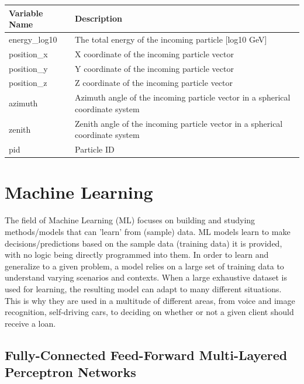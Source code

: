 \documentclass[a4paper,10pt]{scrartcl}
\begin{document}
\begin{center}
    \begin{tabular}{ |l|l| }
        \hline
        Variable Name & Description                                                                    \\
        \hline
        energy\_log10 & The total energy of the incoming particle [log10 GeV]                          \\
        position\_x   & X coordinate of the incoming particle vector                                   \\
        position\_y   & Y coordinate of the incoming particle vector                                   \\
        position\_z   & Z coordinate of the incoming particle vector                                   \\
        azimuth       & Azimuth angle of the incoming particle vector in a spherical coordinate system \\
        zenith        & Zenith angle of the incoming particle vector in a spherical coordinate system  \\
        pid           & Particle ID                                                                    \\
        \hline
    \end{tabular}
\end{center}

\section{Machine Learning}
\label{ml}

The field of Machine Learning (ML) focuses on building and studying methods/models that can 'learn' from (sample) data.
ML models learn to make decisions/predictions based on the sample data (training data) it is provided, with no logic being directly programmed into them.
In order to learn and generalize to a given problem, a model relies on a large set of training data to understand varying scenarios and contexts.
When a large exhaustive dataset is used for learning, the resulting model can adapt to many different situations.
This is why they are used in a multitude of different areas, from voice and image recognition, self-driving cars, to deciding on whether or not a given client should receive a loan.

\subsection{Fully-Connected Feed-Forward Multi-Layered Perceptron Networks}
\end{document}
